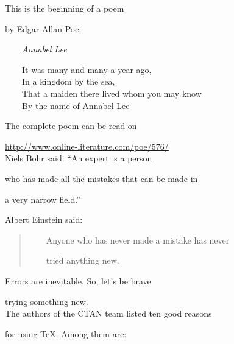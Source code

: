 \documentclass{article}
\begin{document}
\noindent This is the beginning of a poem

by Edgar Allan Poe:

\begin{center}

    \emph{Annabel Lee}

\end{center}

\begin{center}

    It was many and many a year ago,\\

    In a kingdom by the sea,\\

    That a maiden there lived whom you may know\\

    By the name of Annabel Lee

\end{center}

The complete poem can be read on

\url{http://www.online-literature.com/poe/576/}\\[10mm]



\noindent Niels Bohr said: ``An expert is a person

who has made all the mistakes that can be made in

a very narrow field.''

Albert Einstein said:

\begin{quote}

    Anyone who has never made a mistake has never

    tried anything new.

\end{quote}

Errors are inevitable. So, let's be brave

trying something new.\\[10mm]

The authors of the CTAN team listed ten good reasons

for using \TeX. Among them are:
\end{document}
